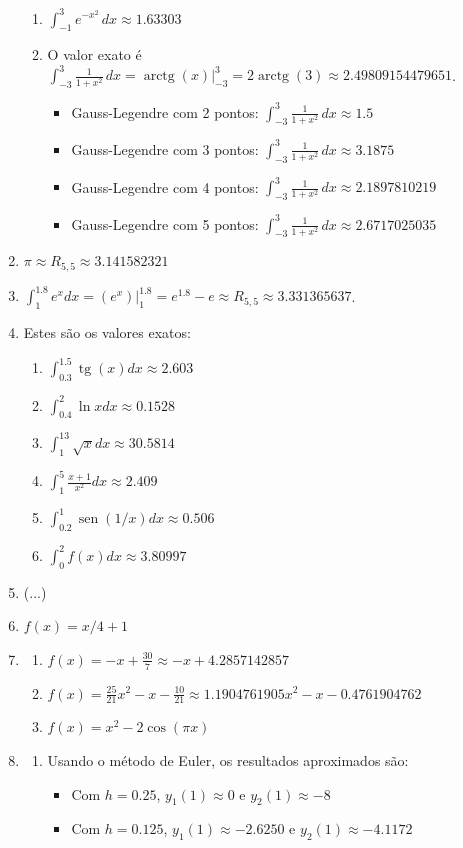 \documentclass[12pt,a4paper]{article}
\newcommand{\fixme}{{\color{red}(...)}}
\newcommand*\sen{\operatorname{sen}}
\newcommand*\tg{\operatorname{tg}}
\newcommand*\arctg{\operatorname{arctg}}
\begin{document}
\begin{enumerate}
\begin{enumerate}
\item $\int_{-1}^3 e^{-x^2}\,dx \approx 1.63303$
\item O valor exato é $\int_{-3}^3 \frac{1}{1+x^2} \,dx = \arctg(x) \Big|_{-3}^3 = 2 \arctg(3) \approx 2.49809154479651$.
\begin{itemize}
\item Gauss-Legendre com 2 pontos: $\int_{-3}^3 \frac{1}{1+x^2} \,dx \approx 1.5$
\item Gauss-Legendre com 3 pontos: $\int_{-3}^3 \frac{1}{1+x^2} \,dx \approx 3.1875$ 
\item Gauss-Legendre com 4 pontos: $\int_{-3}^3 \frac{1}{1+x^2} \,dx \approx 2.1897810219$
\item Gauss-Legendre com 5 pontos: $\int_{-3}^3 \frac{1}{1+x^2} \,dx \approx 2.6717025035$
\end{itemize}
\end{enumerate}
\item $\pi \approx R_{5,5} \approx 3.141582321$
\item $\int_1^{1.8} e^x dx
= \left(e^x \right)\Big|_{1}^{1.8}
= e^{1.8} - e
\approx R_{5,5}
\approx 3.331365637$.
\item Estes são os valores exatos:
\begin{enumerate}
\item $\int_{0.3}^{1.5} \tg(x) dx \approx 2.603$
\item $\int_{0.4}^{2} \ln{x} dx \approx 0.1528$
\item $\int_{1}^{13} \sqrt{x} dx \approx 30.5814$
\item $\int_1^5 \frac{x+1}{x^2} dx \approx 2.409$
\item $\int_{0.2}^{1} \sen(1/x) dx \approx 0.506$
\item $\int_{0}^{2} f(x) dx \approx 3.80997$
\end{enumerate}
\item \fixme
\item $f(x) = x/4 + 1$
\item \begin{enumerate}
\item $f(x) = -x + \frac{30}{7} \approx -x + 4.2857142857$
\item $f(x) = \frac{25}{21}x^2 - x-\frac{10}{21} \approx 1.1904761905x^2 - x - 0.4761904762$
\item $f(x) = x^2 - 2\cos(\pi x)$
\end{enumerate}
\item \begin{enumerate}
\item Usando o método de Euler, os resultados aproximados são:
\begin{itemize}
\item Com $h=0.25$, $y_1(1) \approx 0$ e $y_2(1) \approx -8$
\item Com $h=0.125$, $y_1(1) \approx -2.6250$ e $y_2(1) \approx -4.1172$
\end{itemize}


\end{enumerate}
\end{enumerate}
\end{document}
